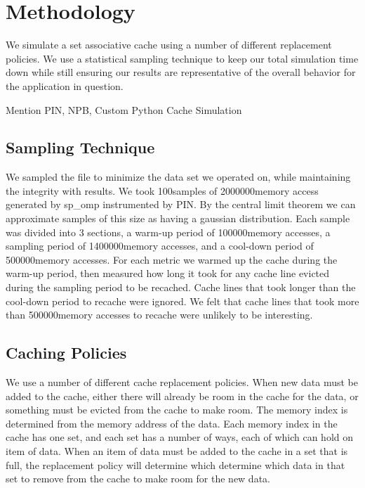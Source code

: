 \newcommand{\SAMPN}{100}
\newcommand{\SAMPK}{2000000}
\newcommand{\SAMP}{1400000}
\newcommand{\WARM}{100000}
\newcommand{\COOL}{500000}
\newcommand{\comment}[1]{}

\section{Methodology}
We simulate a set associative cache using a number of different
replacement policies.
We use a statistical sampling technique to keep our total simulation
time down while still ensuring our results are representative of the
overall behavior for the application in question.

Mention PIN, NPB, Custom Python Cache Simulation

\subsection{Sampling Technique}
We sampled the file to minimize the data set we operated on, while maintaining the integrity with results.
	We took \SAMPN samples of \SAMPK memory access generated by sp\_omp instrumented by PIN.
	By the central limit theorem we can approximate samples of this size as having a gaussian distribution.
	Each sample was divided into 3 sections, a warm-up period of \WARM memory accesses,
		a sampling period of \SAMP memory accesses, and a cool-down period of \COOL memory accesses.
	For each metric we warmed up the cache during the warm-up period,
		then measured how long it took for any cache line evicted during the sampling period to be recached.
	Cache lines that took longer than the cool-down period to recache were ignored.
	We felt that cache lines that took more than \COOL memory accesses to recache were unlikely to be interesting.

\subsection{Caching Policies}

We use a number of different cache replacement policies.  When new data must be added to the cache, either there will already be room in the cache for the data, or something must be evicted from the cache to make room.  The memory index is determined from the memory address of the data.  Each memory index in the cache has one set, and each set has a number of ways, each of which can hold on item of data.  When an item of data must be added to the cache in a set that is full, the replacement policy will determine which determine which data in that set to remove from the cache to make room for the new data.

